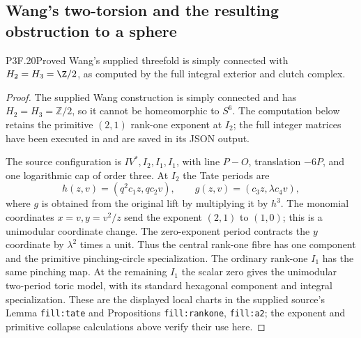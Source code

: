 \subsection{Wang's two-torsion and the resulting obstruction to a sphere}
\begin{statement}{P3F.20}{Proved}
Wang's supplied threefold is simply connected with $H_2=H_3=\Z/2$, as computed by the full integral exterior and clutch complex.
\end{statement}
\begin{proof}
The supplied Wang construction is simply connected and has \(H_2=H_3=\mathbb Z/2\), so it cannot be homeomorphic to \(S^6\). The computation below retains the primitive \((2,1)\) rank-one exponent at \(I_2\); the full integer matrices have been executed in  and are saved in its JSON output.

The source configuration is \(IV^*,I_2,I_1,I_1\), with line \(P-O\), translation \(-6P\), and one logarithmic cap of order three. At \(I_2\) the Tate periods are \[
 h(z,v)=(q^2c_1z,qc_2v),\qquad
 g(z,v)=(c_3z,\lambda c_4v),
\] where \(g\) is obtained from the original lift by multiplying it by \(h^3\). The monomial coordinates \(x=v,y=v^2/z\) send the exponent \((2,1)\) to \((1,0)\); this is a unimodular coordinate change. The zero-exponent period contracts the \(y\) coordinate by \(\lambda^2\) times a unit. Thus the central rank-one fibre has one component and the primitive pinching-circle specialization. The ordinary rank-one \(I_1\) has the same pinching map. At the remaining \(I_1\) the scalar zero gives the unimodular two-period toric model, with its standard hexagonal component and integral specialization. These are the displayed local charts in the supplied source's Lemma \texttt{fill:tate} and Propositions \texttt{fill:rankone}, \texttt{fill:a2}; the exponent and primitive collapse calculations above verify their use here.


\end{proof}
